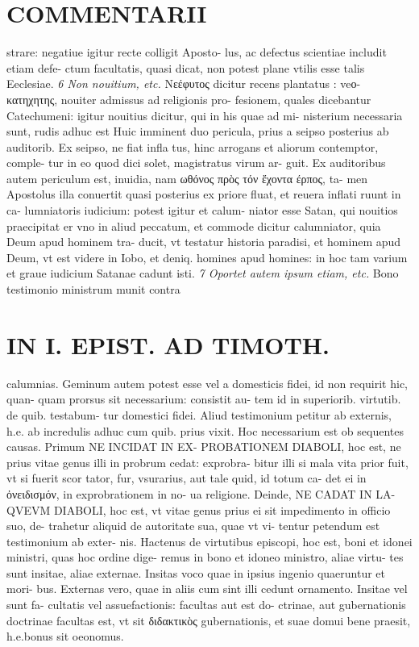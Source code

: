 \documentclass{article}
\begin{document}
\begin{pages}
\section*{COMMENTARII }
\marginpar{[ p.68 ]}\pstart strare: negatiue igitur recte colligit Aposto- lus, ac defectus scientiae includit etiam defe- ctum facultatis, quasi dicat, non potest plane vtilis esse talis Eeclesiae.  \pend
\textit{6 Non nouitium, etc. }\pstart Νεέφυτος dicitur recens plantatus : veο- κατηχητης, nouiter admissus ad religionis pro- fesionem, quales dicebantur Catechumeni: igitur nouitius dicitur, qui in his quae ad mi- nisterium necessaria sunt, rudis adhuc est Huic imminent duo pericula, prius a seipso posterius ab auditorib. Ex seipso, ne fiat infla tus, hinc arrogans et aliorum contemptor, comple- tur in eo quod dici solet, magistratus virum ar- guit. Ex auditoribus autem periculum est, inuidia, nam ωθόνος πρὸς τόν ἔχοντα έρπος, ta- men Apostolus illa conuertit quasi posterius ex priore fluat, et reuera inflati ruunt in ca- lumniatoris iudicium: potest igitur et calum- niator esse Satan, qui nouitios praecipitat er vno in aliud peccatum, et commode dicitur calumniator, quia Deum apud hominem tra- ducit, vt testatur historia paradisi, et hominem apud Deum, vt est videre in Iobo, et deniq. homines apud homines: in hoc tam varium et graue iudicium Satanae cadunt isti.  \pend
\textit{7 Oportet autem ipsum etiam, etc. }\pstart Bono testimonio ministrum munit contra  \pend
\section*{IN I. EPIST. AD TIMOTH. }
\marginpar{[ p.69 ]}\pstart calumnias. Geminum autem potest esse vel a domesticis fidei, id non requirit hic, quan- quam prorsus sit necessarium: consistit au- tem id in superiorib. virtutib. de quib. testabum- tur domestici fidei. Aliud testimonium petitur ab externis, h.e. ab incredulis adhuc cum quib. prius vixit. Hoc necessarium est ob sequentes causas. Primum NE INCIDAT IN EX- PROBATIONEM DIABOLI, hoc est, ne prius vitae genus illi in probrum cedat: exprobra- bitur illi si mala vita prior fuit, vt si fuerit scor tator, fur, vsurarius, aut tale quid, id totum ca- det ei in ὀνειδισμόν, in exprobrationem in no- ua religione. Deinde, NE CADAT IN LA- QVEVM DIABOLI, hoc est, vt vitae genus prius ei sit impedimento in officio suo, de- trahetur aliquid de autoritate sua, quae vt vi- tentur petendum est testimonium ab exter- nis. Hactenus de virtutibus episcopi, hoc est, boni et idonei ministri, quas hoc ordine dige- remus in bono et idoneo ministro, aliae virtu- tes sunt insitae, aliae externae. Insitas voco quae in ipsius ingenio quaeruntur et mori- bus. Externas vero, quae in aliis cum sint illi cedunt ornamento. Insitae vel sunt fa- cultatis vel assuefactionis: facultas aut est do- ctrinae, aut gubernationis doctrinae facultas est, vt sit διδακτικὸς gubernationis, et suae domui bene praesit, h.e.bonus sit oeonomus.  \pend

\end{pages}
\end{document}
